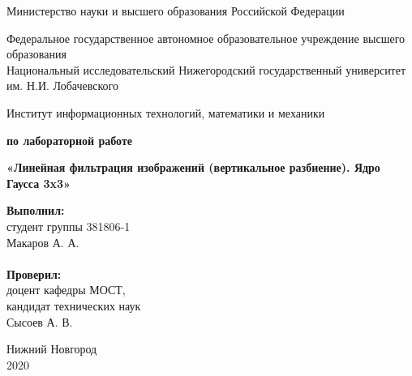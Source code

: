 \documentclass{report}
\begin{document}
\begin{titlepage}

\begin{center}
Министерство науки и высшего образования Российской Федерации
\end{center}

\begin{center}
Федеральное государственное автономное образовательное учреждение высшего образования \\
Национальный исследовательский Нижегородский государственный университет им. Н.И. Лобачевского
\end{center}

\begin{center}
Институт информационных технологий, математики и механики
\end{center}

\vspace{4em}

\begin{center}
\textbf{ по лабораторной работе} \\
\end{center}
\begin{center}
\textbf{\Large«Линейная фильтрация изображений (вертикальное разбиение). Ядро Гаусса 3x3»} \\
\end{center}

\vspace{4em}

\newbox{\lbox}
\newlength{\maxl}
\setlength{\maxl}{\wd\lbox}
\hfill\parbox{7cm}{
\hspace*{5cm}\hspace*{-5cm}\textbf{Выполнил:} \\ студент группы 381806-1 \\ Макаров А. А.\\
\\
\hspace*{5cm}\hspace*{-5cm}\textbf{Проверил:}\\ доцент кафедры МОСТ, \\ кандидат технических наук \\ Сысоев А. В.\\
}
\vspace{\fill}

\begin{center} Нижний Новгород \\ 2020 \end{center}

\end{titlepage}
\end{document}
